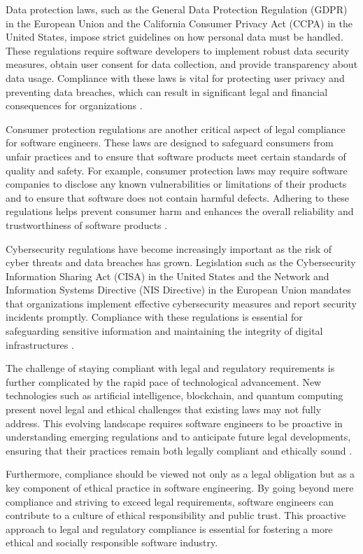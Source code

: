 \begin{refsection}
Data protection laws, such as the General Data Protection Regulation (GDPR) in the European Union and the California Consumer Privacy Act (CCPA) in the United States, impose strict guidelines on how personal data must be handled. These regulations require software developers to implement robust data security measures, obtain user consent for data collection, and provide transparency about data usage. Compliance with these laws is vital for protecting user privacy and preventing data breaches, which can result in significant legal and financial consequences for organizations \cite[pp.~178-182]{solove2011privacy}.

Consumer protection regulations are another critical aspect of legal compliance for software engineers. These laws are designed to safeguard consumers from unfair practices and to ensure that software products meet certain standards of quality and safety. For example, consumer protection laws may require software companies to disclose any known vulnerabilities or limitations of their products and to ensure that software does not contain harmful defects. Adhering to these regulations helps prevent consumer harm and enhances the overall reliability and trustworthiness of software products \cite[pp.~33-35]{baase2018gift}.

Cybersecurity regulations have become increasingly important as the risk of cyber threats and data breaches has grown. Legislation such as the Cybersecurity Information Sharing Act (CISA) in the United States and the Network and Information Systems Directive (NIS Directive) in the European Union mandates that organizations implement effective cybersecurity measures and report security incidents promptly. Compliance with these regulations is essential for safeguarding sensitive information and maintaining the integrity of digital infrastructures \cite[pp.~22-24]{singer2021cybersecurity}.

The challenge of staying compliant with legal and regulatory requirements is further complicated by the rapid pace of technological advancement. New technologies such as artificial intelligence, blockchain, and quantum computing present novel legal and ethical challenges that existing laws may not fully address. This evolving landscape requires software engineers to be proactive in understanding emerging regulations and to anticipate future legal developments, ensuring that their practices remain both legally compliant and ethically sound \cite[pp.~134-136]{spinello1995ethical}.

Furthermore, compliance should be viewed not only as a legal obligation but as a key component of ethical practice in software engineering. By going beyond mere compliance and striving to exceed legal requirements, software engineers can contribute to a culture of ethical responsibility and public trust. This proactive approach to legal and regulatory compliance is essential for fostering a more ethical and socially responsible software industry.


\end{refsection}

